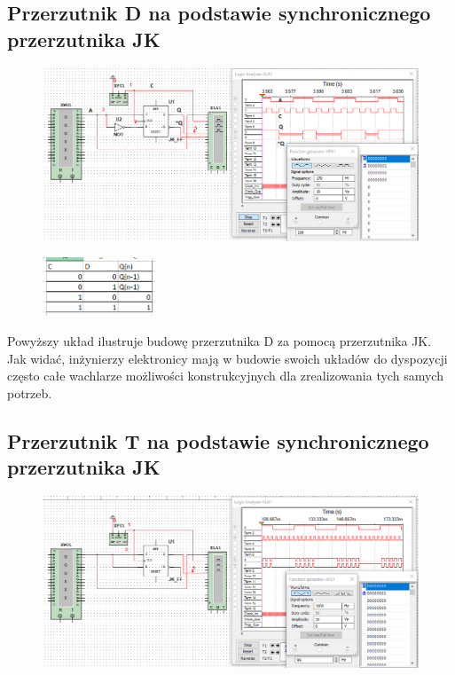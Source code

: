\documentclass[12pt,a4paper]{article}
\begin{document}
\subsection{Przerzutnik D na podstawie synchronicznego przerzutnika JK}
\begin{figure}[H]
\centering
\includegraphics[width=\textwidth]{img/3f}
\end{figure}
\begin{figure}[H]
\centering
\includegraphics[width=0.3\textwidth]{img/3dTruthTable}
\end{figure}

Powyższy układ ilustruje budowę przerzutnika D za pomocą przerzutnika JK. Jak widać, inżynierzy elektronicy mają w budowie swoich układów do dyspozycji często całe wachlarze możliwości konstrukcyjnych dla zrealizowania tych samych potrzeb.


\subsection{Przerzutnik T na podstawie synchronicznego przerzutnika JK}
\begin{figure}[H]
\centering
\includegraphics[width=\textwidth]{img/3g}
\end{figure}
\end{document}
